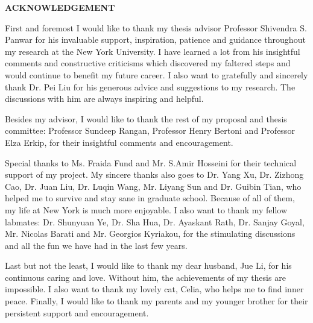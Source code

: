 \newpage
\begin{center}
{\large\bf ACKNOWLEDGEMENT}\vspace{0.3in}
\end{center}
\par First and foremost I would like to thank my thesis advisor Professor Shivendra S. Panwar for his invaluable support, inspiration, patience and guidance throughout my research at the New York University. I have learned a lot from his insightful comments and constructive criticisms which discovered my faltered steps and would continue to benefit my future career. I also want to gratefully and sincerely thank Dr. Pei Liu for his generous advice and suggestions to my research. The discussions with him are always inspiring and helpful.
\par Besides my advisor, I would like to thank the rest of my proposal and thesis committee: Professor Sundeep Rangan, Professor Henry Bertoni and Professor Elza Erkip, for their insightful comments and encouragement.
\par Special thanks to Ms. Fraida Fund and Mr. S.Amir Hosseini for their technical support of my project. My sincere thanks also goes to Dr. Yang Xu, Dr. Zizhong Cao, Dr. Juan Liu, Dr. Luqin Wang, Mr. Liyang Sun and Dr. Guibin Tian, who helped me to survive and stay sane in graduate school. Because of all of them, my life at New York is much more enjoyable. I also want to thank my fellow labmates: Dr. Shunyuan Ye, Dr. Sha Hua, Dr. Ayaskant Rath, Dr. Sanjay Goyal, Mr. Nicolas Barati and Mr. Georgios Kyriakou, for the stimulating discussions and all the fun we have had in the last few years.
\par Last but not the least, I would like to thank my dear husband, Jue Li, for his continuous caring and love. Without him, the achievements of my thesis are impossible. I also want to thank my lovely cat, Celia, who helps me to find inner peace. Finally, I would like to thank my parents and my younger brother for their persistent support and encouragement.




